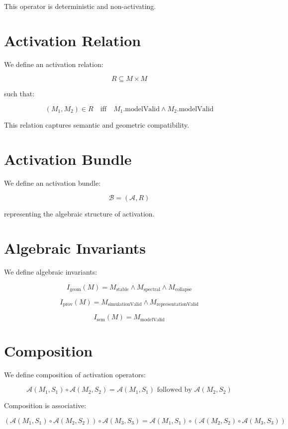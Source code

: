 \documentclass[11pt]{article}
\begin{document}
This operator is deterministic and non-activating.

\section*{Activation Relation}

We define an activation relation:

\[
R \subseteq M \times M
\]

such that:

\[
(M_1, M_2) \in R
\quad \text{iff} \quad
M_1.\text{modelValid} \land M_2.\text{modelValid}
\]

This relation captures semantic and geometric compatibility.

\section*{Activation Bundle}

We define an activation bundle:

\[
\mathcal{B} = (\mathcal{A}, R)
\]

representing the algebraic structure of activation.

\section*{Algebraic Invariants}

We define algebraic invariants:

\[
I_{\text{geom}}(M) =
  M_{\text{stable}} \land M_{\text{spectral}} \land M_{\text{collapse}}
\]

\[
I_{\text{prov}}(M) =
  M_{\text{simulationValid}} \land M_{\text{representationValid}}
\]

\[
I_{\text{sem}}(M) =
  M_{\text{modelValid}}
\]

\section*{Composition}

We define composition of activation operators:

\[
\mathcal{A}(M_1, S_1) \circ \mathcal{A}(M_2, S_2)
  = \mathcal{A}(M_1, S_1) \text{ followed by } \mathcal{A}(M_2, S_2)
\]

Composition is associative:

\[
(\mathcal{A}(M_1, S_1) \circ \mathcal{A}(M_2, S_2)) \circ
  \mathcal{A}(M_3, S_3)
=
\mathcal{A}(M_1, S_1) \circ
  (\mathcal{A}(M_2, S_2) \circ \mathcal{A}(M_3, S_3))
\]
\end{document}
